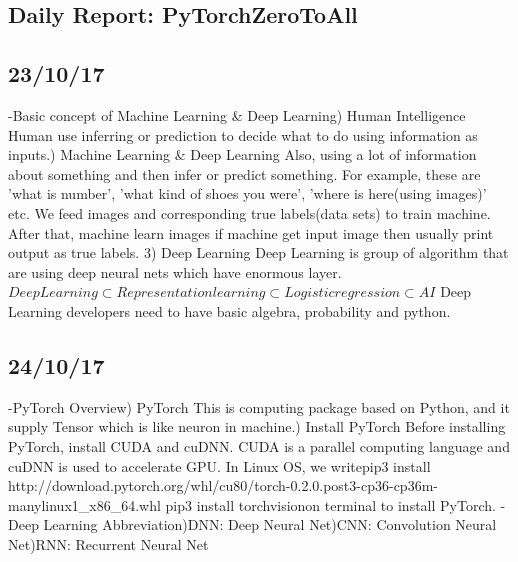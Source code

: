 \documentclass{article}
\begin{document}
\begin{CJK}{UTF8}{}
\section{Daily Report: PyTorchZeroToAll}
\subsection{23/10/17}
-Basic concept of Machine Learning & Deep Learning) Human Intelligence\newline
Human use inferring or prediction to decide what to do using information as inputs.) Machine Learning & Deep Learning\newline
Also, using a lot of information about something and then infer or predict something. For example, these are 'what is number', 'what kind of shoes you were', 'where is here(using images)' etc.
We feed images and corresponding true labels(data sets) to train machine. After that, machine learn images if machine get input image then usually print output as true labels.
3) Deep Learning\newline
Deep Learning is group of algorithm that are using deep neural nets which have enormous layer.\newline
 $Deep Learning\subset Representation learning\subset Logistic regression\subset AI
 $\newline
 Deep Learning developers need to have basic algebra, probability and python.\newline
 
 
\subsection{24/10/17}
-PyTorch Overview) PyTorch\newline
This is computing package based on Python, and it supply Tensor which is like neuron in machine.) Install PyTorch\newline
Before installing PyTorch, install CUDA and cuDNN. CUDA is a parallel computing language and cuDNN is used to accelerate GPU.\newline
In Linux OS, we write\newline pip3 install http://download.pytorch.org/whl/cu80/torch-0.2.0.post3-cp36-cp36m-manylinux1_x86_64.whl 
pip3 install torchvision\newline on terminal to install PyTorch.\newline
-Deep Learning Abbreviation)DNN: Deep Neural Net)CNN: Convolution Neural Net)RNN: Recurrent Neural Net\newline



\end{CJK}
\end{document}
